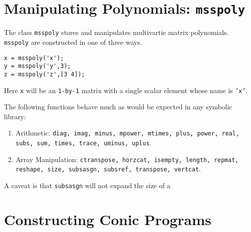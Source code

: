 \documentclass{article}
\title{\spotless{}}
\date{April 22nd, 2012}
\author{Mark M. Tobenkin, Alexandre Megretski}
\newcommand{\spotless}{{SPOT{\relsize{-2}LESS}}}
\newcommand{\matlab}{MATLAB}
\begin{document}
\maketitle
\begin{abstract}
  \spotless{} is a tool for authors of \matlab{} toolboxes which rely on conic optimization.  It provides tools for posing problems to modern interior point SDP solvers such as SeDuMi \cite{SeDuMi} and SDPT3 \cite{SDPT3}.  The design of the toolbox is focused on providing ease for manipulating the objects involved in a problem definition programmatically, and efficiency in creating many related conic constraints simultaneously.  \spotless{} consists of a reduced symbolic polynomial library which uses floating point representation of coefficients and an engine for constructing conic programs represented by these expressions.
\end{abstract}
\section{Manipulating Polynomials: {\tt msspoly}}
The class {\tt msspoly} stores and manipulates multivartie matrix polynomials.  {\tt msspoly} are constructed in one of three ways.

\begin{verbatim}
x = msspoly('x');
y = msspoly('y',3);
z = msspoly('z',[3 4]);
\end{verbatim}

Here {\tt x} will be an {\tt 1-by-1} matrix with a single scalar element whose name is {\tt 'x'}.


The following functions behave much as would be expected in any symbolic library:
\begin{enumerate}
\item Arithmetic: {\tt diag, imag, minus, mpower, mtimes, plus, power, real, subs, sum, times, trace, uminus, uplus}.
\item Array Manipulation: {\tt ctranspose, horzcat, isempty, length, repmat, reshape, size, subsasgn, subsref, transpose, vertcat}.
\end{enumerate}
A caveat is that {\tt subsasgn} will not expand the size of a 
\section{Constructing Conic Programs}
\end{document}
